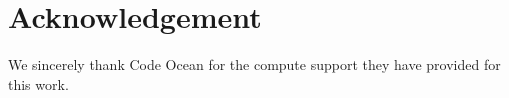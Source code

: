 \section*{Acknowledgement}
We sincerely thank Code Ocean for the compute support they have provided for this work.